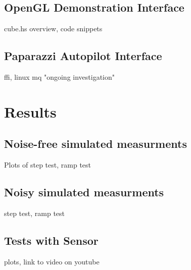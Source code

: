 \documentclass[12pt]{report}
\begin{document}
\subsection{OpenGL Demonstration Interface}
cube.hs overview, code snippets 
\subsection{Paparazzi Autopilot Interface}
ffi, linux mq
"ongoing investigation"

\section{Results}
\subsection{Noise-free simulated measurments}
Plots of step test, ramp test
\subsection{Noisy simulated measurments}
step test, ramp test
\subsection{Tests with Sensor}
plots, link to video on youtube
\end{document}

